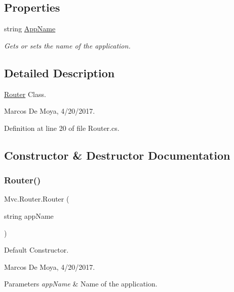 \subsection*{Properties}
\begin{DoxyCompactItemize}
\item 
string \hyperlink{class_mvc_1_1_router_aede73d60bab62819083e10f3815babf7}{App\+Name}
\begin{DoxyCompactList}\small\item\em Gets or sets the name of the application. \end{DoxyCompactList}\end{DoxyCompactItemize}


\subsection{Detailed Description}
\hyperlink{class_mvc_1_1_router}{Router} Class. 

Marcos De Moya, 4/20/2017. 

Definition at line 20 of file Router.\+cs.



\subsection{Constructor \& Destructor Documentation}
\mbox{\label{class_mvc_1_1_router_a875ceb54c490e2d1d3f38d22552c1ccc}} 
\subsubsection{\texorpdfstring{Router()}{Router()}}
{\footnotesize\ttfamily Mvc.\+Router.\+Router (\begin{DoxyParamCaption}\item[{string}]{app\+Name }\end{DoxyParamCaption})}



Default Constructor. 

Marcos De Moya, 4/20/2017. 


\begin{DoxyParams}{Parameters}
{\em app\+Name} & Name of the application. \\
\hline
\end{DoxyParams}


